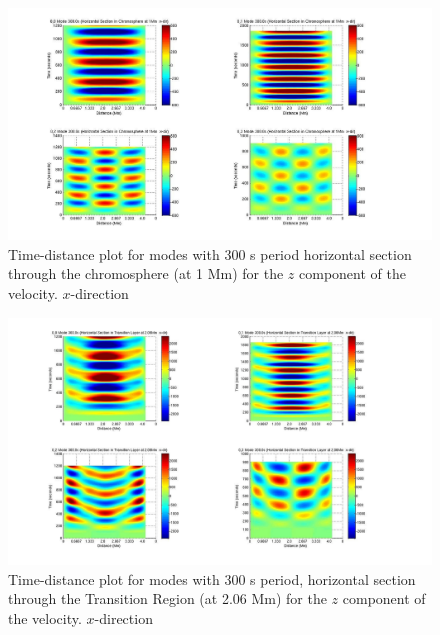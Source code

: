 \documentclass[preprint,authoryear,12pt]{elsarticle}
\begin{document}



\begin{figure}[h]
\includegraphics[scale=0.3]{imrescale/dt_300_0_0_hor_x_1Mm.jpg}
\caption{Time-distance plot for modes with 300 s period horizontal section through the chromosphere (at 1 Mm) for the $z$  component of the velocity. $x$-direction}
\label{Fig11}
\end{figure}

\begin{figure}[h]
\includegraphics[scale=0.3]{imrescale/dt_300_hor_x_2p06Mm.jpg}
\caption{Time-distance plot for modes with 300 s period, horizontal section through the Transition Region (at 2.06 Mm) 
for the $z$  component of the velocity. $x$-direction}
\end{figure}
\end{document}
